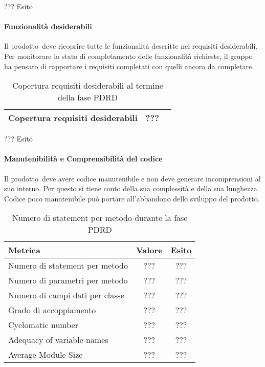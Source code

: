 \documentclass[../PianoDiQualifica.tex]{subfiles}
\begin{document}
\begin{appendices}
			??? Esito 
			
			\paragraph{Funzionalità desiderabili}
				Il prodotto\g\ deve ricoprire tutte le funzionalità descritte nei requisiti desiderabili. Per monitorare lo stato di completamento delle funzionalità richieste, il gruppo ha pensato di rapportare i requisiti completati con quelli ancora da completare.
			\begin{table}[H]
				\centering
				\begin{tabular}{l * {2}{c}}
					\midrule
					Copertura requisiti desiderabili & ??? \\
					\midrule
				\end{tabular}
				\caption{Copertura requisiti desiderabili al termine della fase PDRD}
				\label{tab:copertura_requisiti_desiderabili}
			\end{table}
			
			??? Esito
			
			\paragraph{Manutenibilità e Comprensibilità del codice}
				Il prodotto\g\ deve avere codice manutenibile e non deve generare incomprensioni al suo interno. Per questo si tiene conto della sua complessità e della sua lunghezza. Codice poco manutenibile può portare all'abbandono dello sviluppo del prodotto\g.
			\begin{table}[H]
				\centering
				\begin{tabular}{l * {2}{c}}
					\toprule
					\textbf{Metrica} & \textbf{Valore} & \textbf{Esito} \\
					\midrule
					Numero di statement per metodo & ??? & ??? \\
					Numero di parametri per metodo & ??? & ??? \\
					Numero di campi dati per classe & ??? & ??? \\
					Grado di accoppiamento & ??? & ??? \\
					Cyclomatic number & ??? & ??? \\
					Adequacy of variable names & ??? & ??? \\
					Average Module Size & ??? & ??? \\
					\midrule
				\end{tabular}
				\caption{Numero di statement per metodo durante la fase PDRD}
				\label{tab:numero_statement_metodo}
			\end{table}
			

\end{appendices}
\end{document}
